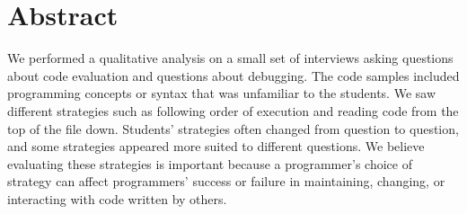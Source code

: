 \section{Abstract}
We performed a qualitative analysis on a small set of interviews asking questions about code evaluation and questions about debugging.
The code samples included programming concepts or syntax that was unfamiliar to the students.
We saw different strategies such as following order of execution and reading code from the top of the file down. Students' strategies often changed from question to question, and some strategies appeared more suited to different questions.
We believe evaluating these strategies is important because a programmer's choice of strategy can affect programmers' success or failure in maintaining, changing, or interacting with code written by others.


